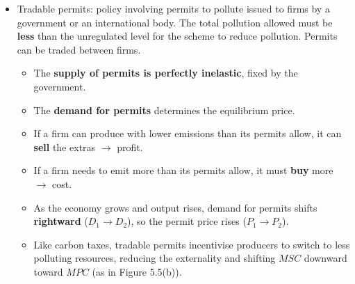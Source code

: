\begin{itemize}
\begin{itemize}
\begin{center}
\end{center}
 \item Tradable permits: policy involving permits to pollute issued to firms by a government or an international body. The total pollution allowed must be \textbf{less} than the unregulated level for the scheme to reduce pollution. Permits can be traded between firms.
    \begin{itemize}
      \item The \textbf{supply of permits is perfectly inelastic}, fixed by the government.
      \item The \textbf{demand for permits} determines the equilibrium price.
      \item If a firm can produce with lower emissions than its permits allow, it can \textbf{sell} the extras $\to$ profit.
      \item If a firm needs to emit more than its permits allow, it must \textbf{buy} more $\to$ cost.
      \item As the economy grows and output rises, demand for permits shifts \textbf{rightward} ($D_1 \to D_2$), so the permit price rises ($P_1 \to P_2$).
      \item Like carbon taxes, tradable permits incentivise producers to switch to less polluting resources, reducing the externality and shifting $MSC$ downward toward $MPC$ (as in Figure 5.5(b)).
    \end{itemize}


\end{itemize}
\end{itemize}
